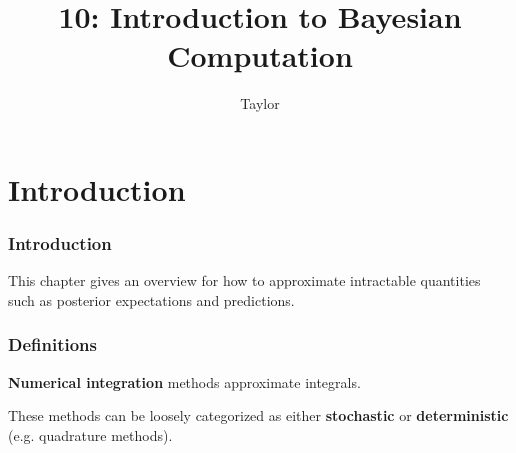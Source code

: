 \documentclass{beamer}
\title["10"]{10: Introduction to Bayesian Computation}
\author{Taylor}
\institute[UVA] 
{
University of Virginia \\
\medskip
\textit{} 
}
\date{}
\begin{document}

\begin{frame}
\titlepage 
\end{frame}



\begin{frame}
\tableofcontents
\end{frame}

\section{Introduction}

\begin{frame}
\frametitle{Introduction}

This chapter gives an overview for how to approximate intractable quantities such as posterior expectations and predictions. 

\end{frame}

\begin{frame}
\frametitle{Definitions}

{\bf Numerical integration} methods approximate integrals. 
\newline

These methods can be loosely categorized as either {\bf stochastic} or {\bf deterministic} (e.g. quadrature methods).


\end{frame}
\end{document}
